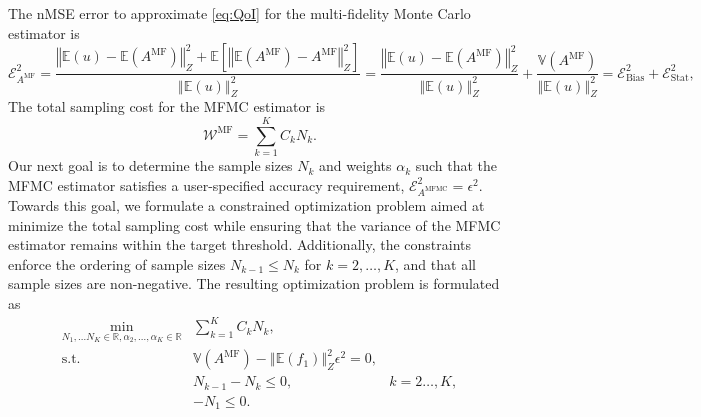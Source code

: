 \documentclass[final,3p,times,11pt]{elsarticle}
\begin{document}
The nMSE error to approximate \eqref{eq:QoI} for the multi-fidelity Monte Carlo estimator is
\[
\mathcal{E}_{A^{\text{MF}}}^2= \frac{\left\Vert\mathbb{E}(u)-\mathbb{E}(A^{\text{MF}}) \right\Vert_{Z}^2+\mathbb E\left[\left\Vert\mathbb{E}(A^{\text{MF}})-A^{\text{MF}} \right\Vert_{Z}^2\right]}{\left\Vert\mathbb{E}(u) \right\Vert_{Z}^2} =\frac{\left\Vert\mathbb{E}(u)-\mathbb{E}(A^{\text{MF}}) \right\Vert_{Z}^2}{\left\Vert\mathbb{E}(u) \right\Vert_{Z}^2}+ \frac{\mathbb{V}\left(A^{\text{MF}}\right)}{\left\Vert\mathbb{E}(u) \right\Vert_{Z}^2}=\mathcal{E}_{\text{Bias}}^2 + \mathcal{E}_{\text{Stat}}^2,
\]
The total sampling cost for the MFMC estimator is 
\[
\mathcal{W}^{\text{MF}} = \sum_{k=1}^K C_kN_k.
\]
Our next goal is to determine the sample sizes $N_k$ and weights $\alpha_k$ such that the MFMC estimator satisfies a user-specified accuracy requirement, $\mathcal{E}_{A^{\text{MFMC}}}^2= \epsilon^2$. Towards this goal, we formulate a constrained optimization problem aimed at minimize the total sampling cost while ensuring that the variance of the MFMC estimator remains within the target threshold. Additionally, the constraints enforce the ordering of sample sizes $N_{k-1}\le N_k$ for $k=2,\ldots, K$, and that all sample sizes are non-negative. The resulting optimization problem is formulated as
\begin{equation}\label{eq:Optimization_pb_sample_size}
    \begin{array}{lll}
    \displaystyle\min_{N_1,\ldots N_K\in \mathbb{R}, \alpha_2,\ldots,\alpha_K\in \mathbb{R}} &\sum_{k=1}^K C_kN_k,\\
       \text{s.t.} &\mathbb{V}\left(A^{\text{MF}}\right)- \left\Vert\mathbb{E}(f_1) \right\Vert_{Z}^2\epsilon^2 = 0,\\
        &\displaystyle N_{k-1}-N_k\le 0, &k=2\ldots,K,\\
        &\displaystyle -N_1\le 0. \\%
    \end{array}
\end{equation}
\end{document}
